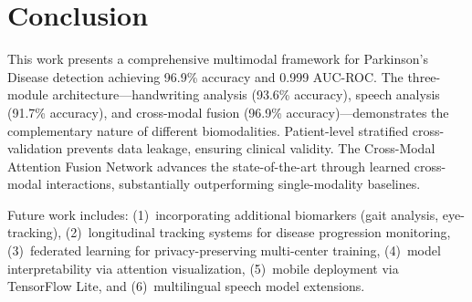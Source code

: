 \documentclass[10pt,conference,letterpaper]{IEEEtran}
\begin{document}
\section{Conclusion}

This work presents a comprehensive multimodal framework for Parkinson's Disease detection achieving 96.9\% accuracy and 0.999 AUC-ROC. The three-module architecture---handwriting analysis (93.6\% accuracy), speech analysis (91.7\% accuracy), and cross-modal fusion (96.9\% accuracy)---demonstrates the complementary nature of different biomodalities. Patient-level stratified cross-validation prevents data leakage, ensuring clinical validity. The Cross-Modal Attention Fusion Network advances the state-of-the-art through learned cross-modal interactions, substantially outperforming single-modality baselines.

Future work includes: (1)~incorporating additional biomarkers (gait analysis, eye-tracking), (2)~longitudinal tracking systems for disease progression monitoring, (3)~federated learning for privacy-preserving multi-center training, (4)~model interpretability via attention visualization, (5)~mobile deployment via TensorFlow Lite, and (6)~multilingual speech model extensions.
\end{document}
